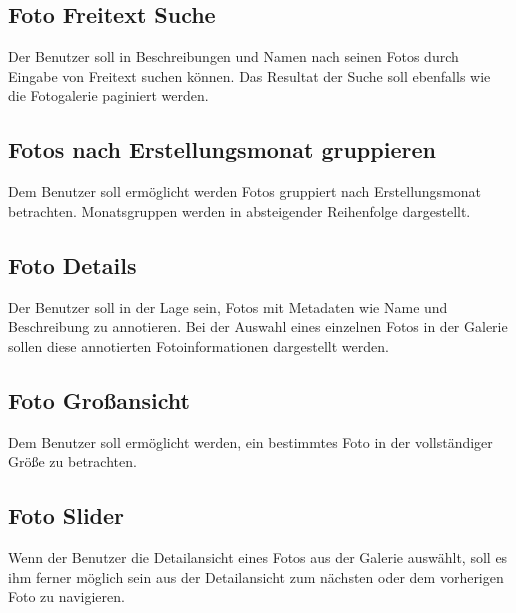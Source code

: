 \subsection{Foto Freitext Suche}
\label{sec:spec:photo_search}

Der Benutzer soll in Beschreibungen und Namen nach seinen Fotos durch Eingabe von Freitext suchen können. Das Resultat der Suche soll ebenfalls wie die Fotogalerie paginiert werden.

\subsection{Fotos nach Erstellungsmonat gruppieren}
\label{sec:spec:photo_groups}

Dem Benutzer soll ermöglicht werden Fotos gruppiert nach Erstellungsmonat betrachten. Monatsgruppen werden in absteigender Reihenfolge dargestellt.

\subsection{Foto Details}
\label{sec:spec:photo_details}

Der Benutzer soll in der Lage sein, Fotos mit Metadaten wie Name und Beschreibung zu annotieren. Bei der Auswahl eines einzelnen Fotos in der Galerie sollen diese annotierten Fotoinformationen dargestellt werden.

\subsection{Foto Großansicht}

Dem Benutzer soll ermöglicht werden, ein bestimmtes Foto in der vollständiger Größe zu betrachten.

\subsection{Foto Slider}
\label{sec:spec:photo_slider}

Wenn der Benutzer die Detailansicht eines Fotos aus der Galerie auswählt, soll es ihm ferner möglich sein aus der Detailansicht zum nächsten oder dem vorherigen Foto zu navigieren.
